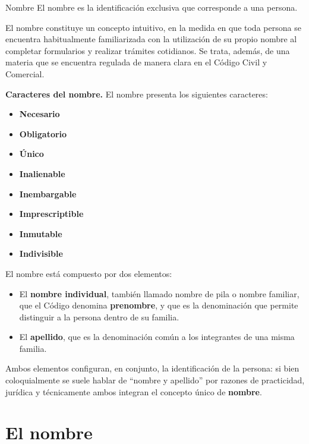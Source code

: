 \documentclass[12pt,oneside]{book}
\begin{document}
\begin{definition}{Nombre}
El nombre es la identificación exclusiva que corresponde a una persona.
\end{definition}

El nombre constituye un concepto intuitivo, en la medida en que toda persona se encuentra habitualmente familiarizada con la utilización de su propio nombre al completar formularios y realizar trámites cotidianos. Se trata, además, de una materia que se encuentra regulada de manera clara en el Código Civil y Comercial.

\textbf{Caracteres del nombre.} El nombre presenta los siguientes caracteres:

\begin{itemize}
\item \textbf{Necesario}
\item \textbf{Obligatorio}
\item \textbf{Único}
\item \textbf{Inalienable}
\item \textbf{Inembargable}
\item \textbf{Imprescriptible}
\item \textbf{Inmutable}
\item \textbf{Indivisible}
\end{itemize}

El nombre está compuesto por dos elementos:

\begin{itemize}
\item El \textbf{nombre individual}, también llamado nombre de pila o nombre familiar, que el Código denomina \textbf{prenombre}, y que es la denominación que permite distinguir a la persona dentro de su familia.
\item El \textbf{apellido}, que es la denominación común a los integrantes de una misma familia.
\end{itemize}

Ambos elementos configuran, en conjunto, la identificación de la persona: si bien coloquialmente se suele hablar de ``nombre y apellido'' por razones de practicidad, jurídica y técnicamente ambos integran el concepto único de \textbf{nombre}.

\chapter{El nombre}
\end{document}

